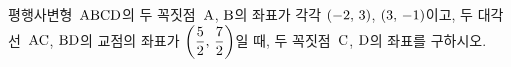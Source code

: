 평행사변형~$\mathrm{ABCD}$의 두 꼭짓점~$\mathrm{A}$, $\mathrm{B}$의 좌표가 각각 $(-2,\mkern3mu 3)$, $(3,\mkern3mu -1)$이고, 두 대각선~$\mathrm{AC}$, $\mathrm{BD}$의 교점의 좌표가 $\left(\dfrac{5}{2},\mkern3mu \dfrac{7}{2}\right)$일 때, 두 꼭짓점~$\mathrm{C}$, $\mathrm{D}$의 좌표를 구하시오.
